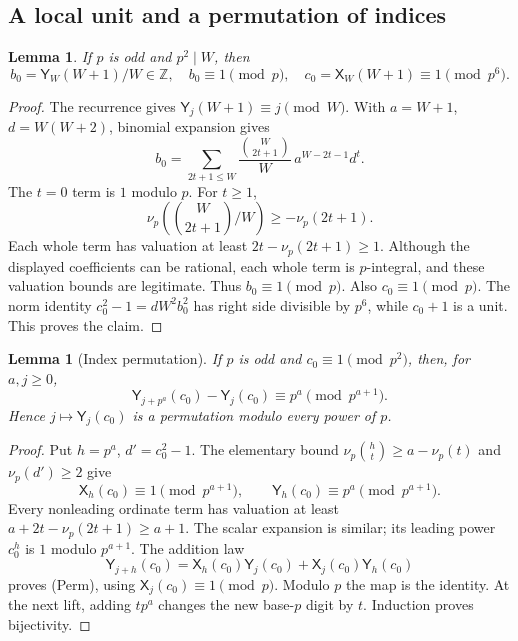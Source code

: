 \documentclass[11pt]{article}
\newtheorem{lemma}[theorem]{Lemma}
\theoremstyle{remark}
\newcommand{\Z}{\mathbb Z}
\newcommand{\vp}{\nu_p}
\newcommand{\PellX}{\mathsf X}
\newcommand{\PellY}{\mathsf Y}
\begin{document}
\subsection{A local unit and a permutation of indices}
\begin{lemma}\label{lem:unit}
If \(p\) is odd and \(p^2\mid W\), then
\[
 b_0=\PellY_W(W+1)/W\in\Z,\quad b_0\equiv1\pmod p,\quad
 c_0=\PellX_W(W+1)\equiv1\pmod{p^6}.
\]
\end{lemma}
\begin{proof}
The recurrence gives \(\PellY_j(W+1)\equiv j\pmod W\).
With \(a=W+1\), \(d=W(W+2)\), binomial expansion gives
\[
 b_0=\sum_{2t+1\le W}
       \frac{\binom W{2t+1}}{W}\,a^{W-2t-1}d^t.
\]
The \(t=0\) term is \(1\) modulo \(p\). For \(t\ge1\),
\[
 \vp\left(\binom W{2t+1}/W\right)\ge-\vp(2t+1).
\]
Each whole term has valuation at least \(2t-\vp(2t+1)\ge1\).
Although the displayed coefficients can be rational, each whole term
is \(p\)-integral, and these valuation bounds are legitimate.
Thus \(b_0\equiv1\pmod p\). Also \(c_0\equiv1\pmod p\).
The norm identity \(c_0^2-1=dW^2b_0^2\) has right side divisible by
\(p^6\), while \(c_0+1\) is a unit. This proves the claim.
\end{proof}

\begin{lemma}[Index permutation]\label{lem:permutation}
If \(p\) is odd and \(c_0\equiv1\pmod{p^2}\), then, for \(a,j\ge0\),
\[
 \PellY_{j+p^a}(c_0)-\PellY_j(c_0)
       \equiv p^a\pmod{p^{a+1}}.                 \tag{Perm}
\]
Hence \(j\mapsto\PellY_j(c_0)\) is a permutation modulo every power of \(p\).
\end{lemma}
\begin{proof}
Put \(h=p^a\), \(d'=c_0^2-1\).
The elementary bound \(\vp\binom h t\ge a-\vp(t)\) and
\(\vp(d')\ge2\) give
\[
 \PellX_h(c_0)\equiv1\pmod{p^{a+1}},\qquad
 \PellY_h(c_0)\equiv p^a\pmod{p^{a+1}}.
\]
Every nonleading ordinate term has valuation at least
\(a+2t-\vp(2t+1)\ge a+1\).
The scalar expansion is similar; its leading power \(c_0^h\) is
\(1\) modulo \(p^{a+1}\).
The addition law
\[
 \PellY_{j+h}(c_0)=\PellX_h(c_0)\PellY_j(c_0)
                         +\PellX_j(c_0)\PellY_h(c_0)
\]
proves (Perm), using \(\PellX_j(c_0)\equiv1\pmod p\).
Modulo \(p\) the map is the identity. At the next lift, adding \(tp^a\)
changes the new base-\(p\) digit by \(t\). Induction proves bijectivity.
\end{proof}
\end{document}
